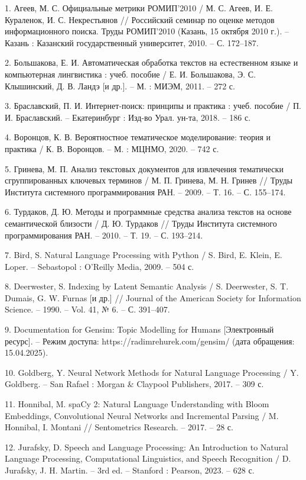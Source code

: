 
1. Агеев, М. С. Официальные метрики РОМИП'2010 / М. С. Агеев, И. Е. Кураленок, И. С. Некрестьянов // Российский семинар по оценке методов информационного поиска. Труды РОМИП'2010 (Казань, 15 октября 2010 г.). – Казань : Казанский государственный университет, 2010. – С. 172–187.

2. Большакова, Е. И. Автоматическая обработка текстов на естественном языке и компьютерная лингвистика : учеб. пособие / Е. И. Большакова, Э. С. Клышинский, Д. В. Ландэ [и др.]. – М. : МИЭМ, 2011. – 272 с.

3. Браславский, П. И. Интернет-поиск: принципы и практика : учеб. пособие / П. И. Браславский. – Екатеринбург : Изд-во Урал. ун-та, 2018. – 186 с.

4. Воронцов, К. В. Вероятностное тематическое моделирование: теория и практика / К. В. Воронцов. – М. : МЦНМО, 2020. – 742 с.

5. Гринева, М. П. Анализ текстовых документов для извлечения тематически сгруппированных ключевых терминов / М. П. Гринева, М. Н. Гринев // Труды Института системного программирования РАН. – 2009. – Т. 16. – С. 155–174.

6. Турдаков, Д. Ю. Методы и программные средства анализа текстов на основе семантической близости / Д. Ю. Турдаков // Труды Института системного программирования РАН. – 2010. – Т. 19. – С. 193–214.

7. Bird, S. Natural Language Processing with Python / S. Bird, E. Klein, E. Loper. – Sebastopol : O'Reilly Media, 2009. – 504 с.

8. Deerwester, S. Indexing by Latent Semantic Analysis / S. Deerwester, S. T. Dumais, G. W. Furnas [и др.] // Journal of the American Society for Information Science. – 1990. – Vol. 41, № 6. – С. 391–407.

9. Documentation for Gensim: Topic Modelling for Humans [Электронный ресурс]. – Режим доступа: https://radimrehurek.com/gensim/ (дата обращения: 15.04.2025).

10. Goldberg, Y. Neural Network Methods for Natural Language Processing / Y. Goldberg. – San Rafael : Morgan \& Claypool Publishers, 2017. – 309 с.

11. Honnibal, M. spaCy 2: Natural Language Understanding with Bloom Embeddings, Convolutional Neural Networks and Incremental Parsing / M. Honnibal, I. Montani // Sentometrics Research. – 2017. – 28 с.

12. Jurafsky, D. Speech and Language Processing: An Introduction to Natural Language Processing, Computational Linguistics, and Speech Recognition / D. Jurafsky, J. H. Martin. – 3rd ed. – Stanford : Pearson, 2023. – 628 с.

